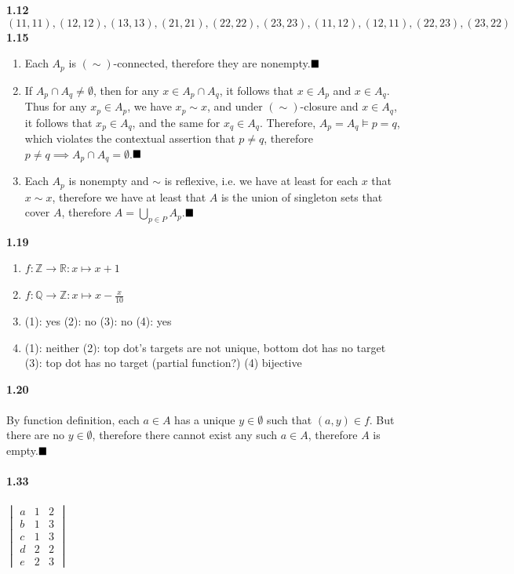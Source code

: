 \documentclass{article}
\begin{document}
\textbf{1.12}
$$ (11,11),(12,12),(13,13),(21,21),(22,22),(23,23),(11,12),(12,11),(22,23),(23,22) $$
\textbf{1.15}
\begin{enumerate}
	\item Each $A_p$ is $(\sim )$-connected, therefore they are nonempty.$\hfill\blacksquare$
	\item If $A_p\cap A_q\neq\emptyset$, then for any $x\in A_p\cap A_q$, it follows  that $x\in A_p$ and $x\in A_q$. Thus for any $x_p\in A_p$, we have $x_p\sim x$, and under $(\sim )$-closure and $x\in A_q$, it follows that $x_p\in A_q$, and the same for $x_q\in A_q$. Therefore, $A_p=A_q \vDash p=q$, which violates the contextual assertion that $p\neq q$, therefore $p\neq q\implies A_p\cap A_q=\emptyset$.$\hfill\blacksquare$
	\item Each $A_p$ is nonempty and $\sim$ is reflexive, i.e. we have at least for each $x$ that $x\sim x$, therefore we have at least that $A$ is the union of singleton sets that cover $A$, therefore $A=\bigcup_{p\in P} A_p$.$\hfill\blacksquare$
\end{enumerate}\bigskip
\textbf{1.19}
\begin{enumerate}
	\item $f:\mathbb{Z}\rightarrow\mathbb{R}: x\mapsto x+1$
	\item $f:\mathbb{Q}\rightarrow\mathbb{Z}: x\mapsto x-\frac{x}{10}$
	\item (1): yes (2): no (3): no (4): yes 
	\item (1): neither (2): top dot's targets are not unique, bottom dot has no target (3): top dot has no target (partial function?) (4) bijective
\end{enumerate}\bigskip
\textbf{1.20}\\
 \\
By function definition, each $a\in A$ has a unique $y\in\emptyset$ such that $(a,y)\in f$. But there are no $y\in\emptyset$, therefore there cannot exist any such $a\in A$, therefore $A$ is empty.$\hfill\blacksquare$\\
 \\
\textbf{1.33}\\
 \\
$
\begin{vmatrix}
a & 1 & 2\\
b & 1 & 3\\
c & 1 & 3\\
d & 2 & 2\\
e & 2 & 3
\end{vmatrix}
$\\
\end{document}
